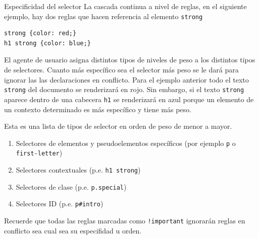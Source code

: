 \begin{frame}{Especificidad del selector} %
    La cascada continua a nivel de reglas, en el siguiente ejemplo, hay dos
    reglas que hacen referencia al elemento \texttt{strong} \\[0.5cm]
\begin{lstlisting}
strong {color: red;}
h1 strong {color: blue;}
\end{lstlisting}

    El agente de usuario asigna distintos tipos de niveles de peso a los
    distintos tipos de selectores. Cuanto más específico sea el selector más
    peso se le dará para ignorar las las declaraciones en conflicto. Para el
    ejemplo anterior todo el texto \texttt{strong} del documento se renderizará
    en rojo. Sin embargo, si el texto \texttt{strong} aparece dentro de una
    cabecera \texttt{h1} se renderizará en azul porque un elemento de un
    contexto determinado es más específico y tiene más peso. 

    Esta es una lista de tipos de selector en orden de peso de menor a mayor.

    \begin{enumerate}
        \item Selectores de elementos y pseudoelementos específicos (por
        ejemplo \texttt{p} o \texttt{first-letter}) 
        \item Selectores contextuales (p.e. \texttt{h1 strong})
        \item Selectores de clase (p.e. \texttt{p.special})
        \item Selectores ID (p.e. \texttt{p\#intro})
    \end{enumerate}

    Recuerde que todas las reglas marcadas como \texttt{!important} ignorarán
    reglas en conflicto sea cual sea su especifidad u orden. 
\end{frame}

